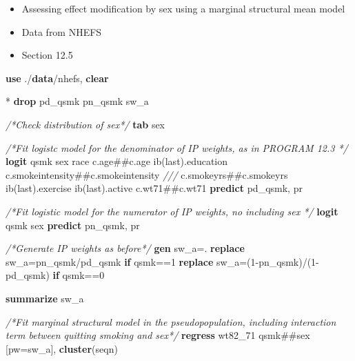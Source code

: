 \documentclass[
  10pt,
]{book}
\newenvironment{Shaded}{\begin{snugshade}}{\end{snugshade}}
\newcommand{\CommentTok}[1]{\textcolor[rgb]{0.56,0.35,0.01}{\textit{#1}}}
\newcommand{\FunctionTok}[1]{\textcolor[rgb]{0.00,0.00,0.00}{#1}}
\newcommand{\KeywordTok}[1]{\textcolor[rgb]{0.13,0.29,0.53}{\textbf{#1}}}
\newcommand{\NormalTok}[1]{#1}
\providecommand{\tightlist}{%
  \setlength{\itemsep}{0pt}\setlength{\parskip}{0pt}}
\begin{document}
\begin{itemize}
\tightlist
\item
  Assessing effect modification by sex using a marginal structural mean model
\item
  Data from NHEFS
\item
  Section 12.5
\end{itemize}

\begin{Shaded}
\begin{Highlighting}[]
\KeywordTok{use}\NormalTok{ ./}\KeywordTok{data}\NormalTok{/nhefs, }\KeywordTok{clear}

\NormalTok{* }\KeywordTok{drop}\NormalTok{ pd_qsmk pn_qsmk sw_a}

\CommentTok{/*Check distribution of sex*/}
\KeywordTok{tab}\NormalTok{ sex}

\CommentTok{/*Fit logistc model for the denominator of IP weights, as in PROGRAM 12.3 */}
\KeywordTok{logit}\NormalTok{ qsmk sex race c.age##c.age ib(}\FunctionTok{last}\NormalTok{).education c.smokeintensity##c.smokeintensity }\CommentTok{///}
\NormalTok{c.smokeyrs##c.smokeyrs ib(}\FunctionTok{last}\NormalTok{).exercise ib(}\FunctionTok{last}\NormalTok{).active c.wt71##c.wt71 }
\KeywordTok{predict}\NormalTok{ pd_qsmk, pr}

\CommentTok{/*Fit logistic model for the numerator of IP weights, no including sex */}
\KeywordTok{logit}\NormalTok{ qsmk sex}
\KeywordTok{predict}\NormalTok{ pn_qsmk, pr}

\CommentTok{/*Generate IP weights as before*/}
\KeywordTok{gen}\NormalTok{ sw_a=.}
\KeywordTok{replace}\NormalTok{ sw_a=pn_qsmk/pd_qsmk }\KeywordTok{if}\NormalTok{ qsmk==1}
\KeywordTok{replace}\NormalTok{ sw_a=(1-pn_qsmk)/(1-pd_qsmk) }\KeywordTok{if}\NormalTok{ qsmk==0}

\KeywordTok{summarize}\NormalTok{ sw_a}

\CommentTok{/*Fit marginal structural model in the pseudopopulation, including interaction term between quitting smoking and sex*/}
\KeywordTok{regress}\NormalTok{ wt82_71 qsmk##sex [pw=sw_a], }\KeywordTok{cluster}\NormalTok{(seqn)}
\end{Highlighting}
\end{Shaded}
\end{document}

